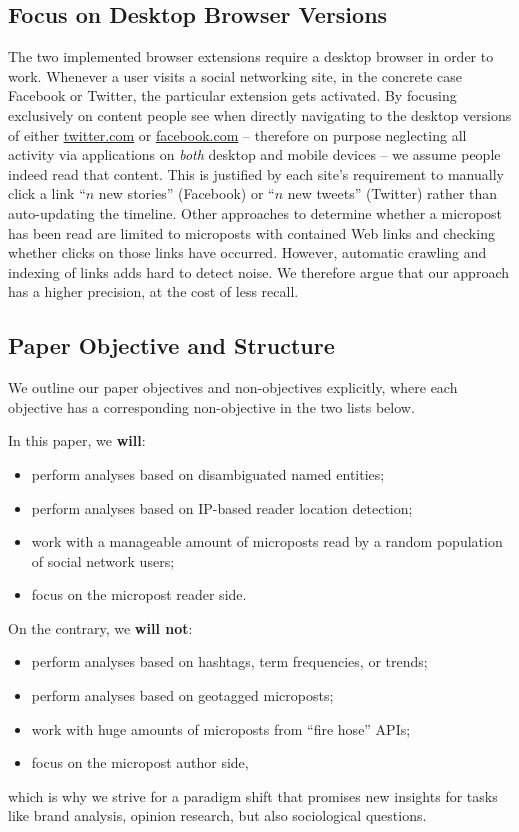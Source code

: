 \documentclass{iosart2c}
\begin{document}
\subsection{Focus on Desktop Browser Versions}
The two implemented browser extensions require a desktop browser in order to work.
Whenever a user visits a social networking site, in the concrete case Facebook or Twitter, the particular extension gets activated.
By focusing exclusively on content people see when directly navigating to the desktop versions of either \url{twitter.com} or \url{facebook.com} -- therefore on purpose neglecting all activity via applications on \emph{both} desktop and mobile devices -- we assume people indeed read that content.
This is justified by each site's requirement to manually click a link ``$\mathit{n}$ new stories'' (Facebook) or ``$\mathit{n}$ new tweets'' (Twitter) rather than auto-updating the timeline.
Other approaches to determine whether a micropost has been read are limited to microposts with contained Web links and checking whether clicks on those links have occurred.
However, automatic crawling and indexing of links adds hard to detect noise.
We therefore argue that our approach has a higher precision, at the cost of less recall.

\subsection{Paper Objective and Structure}
We outline our paper objectives and non-objectives explicitly, where  each objective has a corresponding non-objective in the two lists below.

\noindent In this paper, we \textbf{will}:
\begin{itemize}
	\item perform analyses based on disambiguated named entities;
	\item perform analyses based on IP-based reader location detection;
	\item work with a manageable amount of microposts read by a random population of social network users;
	\item focus on the micropost reader side.
\end{itemize}
On the contrary, we \textbf{will not}:
\begin{itemize}
	\item perform analyses based on hashtags, term frequencies, or trends;
	\item perform analyses based on geotagged microposts;
	\item work with huge amounts of microposts from ``fire hose'' APIs;
	\item focus on the micropost author side,
\end{itemize}
which is why we strive for a paradigm shift that promises new insights for tasks like brand analysis, opinion research, but also sociological questions.
\end{document}
